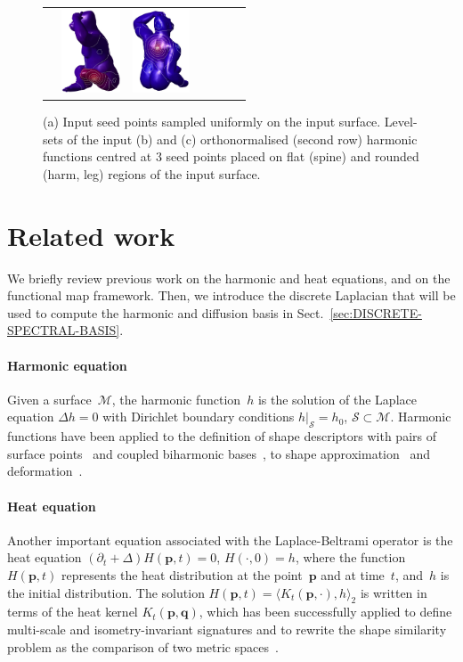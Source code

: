 \documentclass[acmtog,authorversion]{acmart}
\begin{document}
\begin{figure}[t]
\begin{tabular}{c|ccc|ccc}
&\includegraphics[height=70pt]{FMAP-images/monkey-harmonic-input-3-ORTH.jpg}
&\includegraphics[height=70pt]{FMAP-images/monkey-harmonic-input-4-ORTH.jpg}
\end{tabular}
\caption{(a) Input seed points sampled uniformly on the input surface. Level-sets of the input (b) and (c) orthonormalised (second row) harmonic functions centred at 3 seed points placed on flat (spine) and rounded (harm, leg) regions of the input surface.\label{fig:MONKEY-HARM}}
\end{figure}
%
\section{Related work\label{sec:RELATED-WORK}}
We briefly review previous work on the harmonic and heat equations, and on the functional map framework. Then, we introduce the discrete Laplacian that will be used to compute the harmonic and diffusion basis in Sect.~\ref{sec:DISCRETE-SPECTRAL-BASIS}.

\paragraph*{Harmonic equation}
Given a surface~$\mathcal{M}$, the harmonic function~$h$ is the solution of the Laplace equation \mbox{$\Delta h=0$} with Dirichlet boundary conditions \mbox{$h|_{\mathcal{S}}=h_{0}$}, \mbox{$\mathcal{S}\subset\mathcal{M}$}. Harmonic functions have been applied to the definition of shape descriptors with pairs of surface points~\citep{ZHENG2013} and coupled biharmonic bases~\citep{KONVATSKY2013}, to shape approximation~\citep{FENG2012} and deformation~\citep{JOSHI2007,JACOBSON2014,WEBER2012}.

\paragraph*{Heat equation}
Another important equation associated with the Laplace-Beltrami operator is the heat equation \mbox{$(\partial_{t}+\Delta) H(\mathbf{p},t)=0$}, \mbox{$H(\cdot,0)=h$}, where the function \mbox{$H(\mathbf{p},t)$} represents the heat distribution at the point~$\mathbf{p}$ and at time~$t$, and~$h$ is the initial distribution. The solution \mbox{$H(\mathbf{p},t)=\langle K_{t}(\mathbf{p},\cdot),h\rangle_{2}$} is written in terms of the heat kernel \mbox{$K_{t}(\mathbf{p},\mathbf{q})$}, which has been successfully applied to define multi-scale and isometry-invariant signatures and to rewrite the shape similarity problem as the comparison of two metric spaces~\citep{BRONSTEIN2009,BRONSTEIN2010-TOG,COIFMAN2006,GEBAL2009,MEMOLI2011,OVSJANKOV2010,RUSTAMOV2007,SUN2009}.
\end{document}
